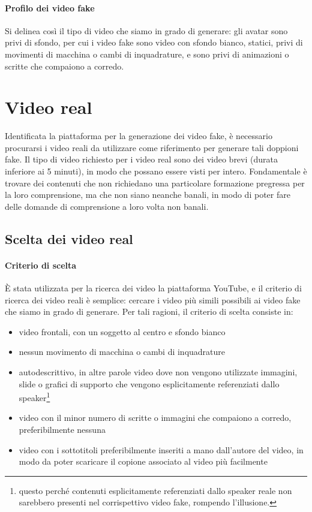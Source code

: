 \paragraph{Profilo dei video fake}
Si delinea così il tipo di video che siamo in grado di generare: gli avatar sono privi di sfondo, per cui i video fake sono video con sfondo bianco, statici, privi di movimenti di macchina o cambi di inquadrature, e sono privi di animazioni o scritte che compaiono a corredo.

\section{Video real}

Identificata la piattaforma per la generazione dei video fake, è necessario procurarsi i video reali da utilizzare come riferimento per generare tali doppioni fake. Il tipo di video richiesto per i video real sono dei video brevi (durata inferiore ai 5 minuti), in modo che possano essere visti per intero. Fondamentale è trovare dei contenuti che non richiedano una particolare formazione pregressa per la loro comprensione, ma che non siano neanche banali, in modo di poter fare delle domande di comprensione a loro volta non banali. 

\subsection{Scelta dei video real}

\paragraph{Criterio di scelta}
È stata utilizzata per la ricerca dei video la piattaforma YouTube, e il criterio di ricerca dei video reali è semplice: cercare i video più simili possibili ai video fake che siamo in grado di generare. Per tali ragioni, il criterio di scelta consiste in:
\begin{itemize}
    \item video frontali, con un soggetto al centro e sfondo bianco
    \item nessun movimento di macchina o cambi di inquadrature
    \item autodescrittivo, in altre parole video dove non vengono utilizzate immagini, slide o grafici di supporto che vengono esplicitamente referenziati dallo speaker\footnote{questo perché contenuti esplicitamente referenziati dallo speaker reale non sarebbero presenti nel corrispettivo video fake, rompendo l'illusione.}
    \item video con il minor numero di scritte o immagini che compaiono a corredo, preferibilmente nessuna
    \item video con i sottotitoli preferibilmente inseriti a mano dall'autore del video, in modo da poter scaricare il copione associato al video più facilmente
\end{itemize}

